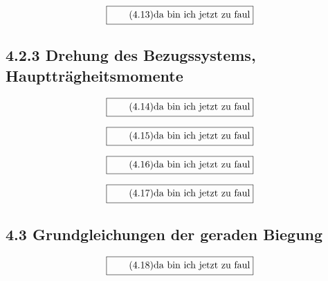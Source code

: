 \documentclass[11pt]{article}
\newcommand{\1}{ {\mathds{1}} }
\begin{document}
    \begin{equation}
      \boxed{
        \tag{4.13}
        \begin{split}
          \text{da bin ich jetzt zu faul}
        \end{split}
      }
    \end{equation}

    \subsection*{4.2.3 Drehung des Bezugssystems, Hauptträgheitsmomente}

    \begin{equation}
      \boxed{
        \tag{4.14}
        \begin{split}
          \text{da bin ich jetzt zu faul}
        \end{split}
      }
    \end{equation}

    \begin{equation}
      \boxed{
        \tag{4.15}
        \begin{split}
          \text{da bin ich jetzt zu faul}
        \end{split}
      }
    \end{equation}

    \begin{equation}
      \boxed{
        \tag{4.16}
        \begin{split}
          \text{da bin ich jetzt zu faul}
        \end{split}
      }
    \end{equation}

    \begin{equation}
      \boxed{
        \tag{4.17}
        \begin{split}
          \text{da bin ich jetzt zu faul}
        \end{split}
      }
    \end{equation}
    
    \subsection*{4.3 Grundgleichungen der geraden Biegung}

    \begin{equation}
      \boxed{
        \tag{4.18}
        \begin{split}
          \text{da bin ich jetzt zu faul}
        \end{split}
      }
    \end{equation}
\end{document}
